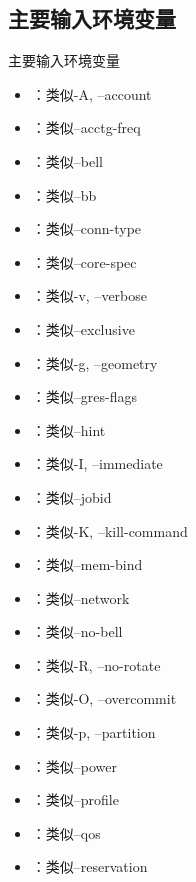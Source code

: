 \subsection{主要输入环境变量}
\begin{frame}{主要输入环境变量}
\begin{itemize}
	\item {}：类似-A, --account
	\item {}：类似--acctg-freq
	\item {}：类似--bell
	\item {}：类似--bb
	\item {}：类似--conn-type
	\item {}：类似--core-spec
	\item {}：类似-v, --verbose
	\item {}：类似--exclusive
	\item {}：类似-g, --geometry
	\item {}：类似--gres-flags
	\item {}：类似--hint
	\item {}：类似-I, --immediate
	\item {}：类似--jobid
	\item {}：类似-K, --kill-command
	\item {}：类似--mem-bind
	\item {}：类似--network
	\item {}：类似--no-bell
	\item {}：类似-R, --no-rotate
	\item {}：类似-O, --overcommit
	\item {}：类似-p, --partition
	\item {}：类似--power
	\item {}：类似--profile
	\item {}：类似--qos
	\item {}：类似--reservation

\end{itemize}
\end{frame}
